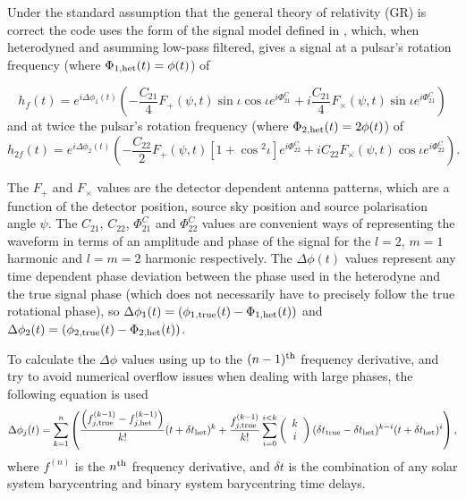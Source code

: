 Under the standard assumption that the general theory of relativity (GR) is correct the code uses the form of
the signal model defined in \citet{2015arXiv150105832J}, which, when heterodyned and asumming low-pass
filtered, gives a signal at a pulsar's rotation frequency (where $\Phi_{1,{\rm het}}(t) = \phi(t)$) of
\begin{widetext}
\begin{equation}\label{eq:hf}
h_f(t) =  e^{i\Delta\phi_1(t)}\left(-\frac{C_{21}}{4}F_{+}(\psi,t)\sin{\iota}\cos{\iota}e^{i\Phi_{21}^C} +
i\frac{C_{21}}{4}F_{\times}(\psi,t)\sin{\iota}e^{i\Phi_{21}^C} \right)
\end{equation}
and at twice the pulsar's rotation frequency (where $\Phi_{2,{\rm het}}(t) = 2\phi(t)$) of
\begin{equation}\label{eq:h2f}
h_{2f}(t) =  e^{i\Delta\phi_2(t)}\left(-\frac{C_{22}}{2}F_{+}(\psi,t)[1+\cos{}^2\iota]e^{i\Phi_{22}^C} +
iC_{22}F_{\times}(\psi,t)\cos{\iota}e^{i\Phi_{22}^C} \right).
\end{equation}
\end{widetext}
The $F_{+}$ and $F_{\times}$ values are the detector dependent antenna patterns, which are a function of the
detector position, source sky position and source polarisation angle $\psi$. The $C_{21}$, $C_{22}$,
$\Phi_{21}^C$ and $\Phi_{22}^C$ values are convenient ways of representing the waveform in terms of an
amplitude and phase of the signal for the $l=2$, $m=1$ harmonic and $l=m=2$ harmonic respectively. The
$\Delta\phi(t)$ values represent any time dependent phase deviation between the phase used in the heterodyne
and the true signal phase (which does not necessarily have to precisely follow the true rotational phase), so
$\Delta\phi_1(t) = (\phi_{1,{\rm true}}(t)-\Phi_{1,{\rm het}}(t))$ and $\Delta\phi_2(t) = (\phi_{2,{\rm
true}}(t)-\Phi_{2,{\rm het}}(t))$.

To calculate the $\Delta\phi$ values using up to the $(n-1)^{\rm th}$ frequency derivative, and try to avoid numerical overflow issues when dealing with large
phases, the following equation is used
\begin{equation}
\Delta\phi_j(t) = \sum_{k=1}^n \left( \frac{\left(f^{(k-1)}_{j,{\rm true}} - f^{(k-1)}_{j,{\rm het}}\right)}{k!}(t+\delta t_{\rm het})^k + \frac{f^{(k-1)}_{j,{\rm true}}}{k!} \sum_{i=0}^{i<k} \left(\begin{array}{c}k \\ i\end{array} \right) (\delta t_{\rm true}-\delta t_{\rm het})^{k-i} (t+\delta t_{\rm het})^i \right),
\end{equation}
where $f^{(n)}$ is the $n^{\rm th}$ frequency derivative, and $\delta t$ is the combination of any solar system barycentring and binary system
barycentring time delays.

